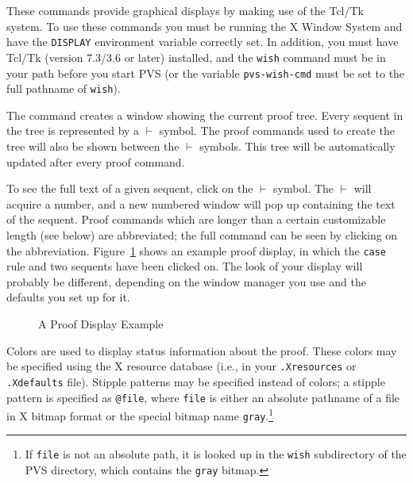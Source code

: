 These commands provide graphical displays by making use of the
Tcl/Tk~\cite{Tcl/TK} system.  To use these commands you must be running
the X Window System and have the
\texttt{DISPLAY} environment variable correctly set.
In addition, you must have Tcl/Tk (version 7.3/3.6 or later)
installed, and the \texttt{wish} command must be in your path before you
start PVS (or the variable \texttt{pvs-wish-cmd} must be set to the full
pathname of \texttt{wish}).  

The  command creates a window showing the
cur\-rent proof tree.  Every sequent in the tree is represented by a
$\vdash$ symbol.  The proof commands used to create
the tree will also be shown between the $\vdash$ symbols.  This tree will
be automatically updated after every proof command.


To see the full text of a given sequent, click on the $\vdash$ symbol.
The $\vdash$ will acquire a number, and a new numbered window will pop up
containing the text of the sequent.  Proof commands which are longer than
a certain customizable length (see below) are abbreviated; the full
command can be seen by clicking on the abbreviation.
Figure~\ref{proofwindow} shows an example proof display, in which the
\texttt{case} rule and two sequents have been clicked on.  The look of
your display will probably be different, depending on the window manager
you use and the defaults you set up for it.

\begin{figure}
\vspace{8in}
\caption{A Proof Display Example}\label{proofwindow}
\end{figure}

Colors are used to display status information about the proof.  These
colors may be specified using the X resource database (i.e., in your
\texttt{.Xresources} or \texttt{.Xdefaults} file).  Stipple patterns may
be specified instead of colors; a stipple pattern is specified as
\texttt{@file}, where \texttt{file} is either an absolute pathname of a
file in X bitmap format or the special bitmap name
\texttt{gray}.\footnote{If \texttt{file} is not an absolute path, it is
looked up in the \texttt{wish} subdirectory of the PVS directory, which
contains the \texttt{gray} bitmap.}


